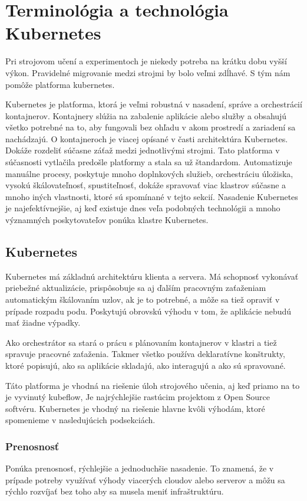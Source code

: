 

\chapter{Terminológia a technológia Kubernetes}
Pri strojovom učení a experimentoch je niekedy potreba na krátku dobu vyšší výkon. Pravidelné migrovanie medzi strojmi by bolo veľmi zdĺhavé. S tým nám pomôže platforma kubernetes.

Kubernetes je platforma, ktorá je veľmi robustná v nasadení, správe a orchestrácií kontajnerov. Kontajnery slúžia na zabalenie aplikácie alebo služby a obsahujú všetko potrebné na to, aby fungovali bez ohľadu v akom prostredí a zariadení sa nachádzajú. O kontajneroch je viacej opísané v časti architektúra Kubernetes. Dokáže rozdeliť súčasne záťaž medzi jednotlivými strojmi. Tato platforma v súčasnosti vytlačila predošle platformy a stala sa už štandardom. Automatizuje manuálne procesy, poskytuje mnoho doplnkových služieb, orchestráciu úložiska, vysokú škálovateľnosť, spustiteľnosť, dokáže spravovať viac klastrov súčasne a mnoho iných vlastnosti, ktoré sú spomínané v tejto sekcií.\cite{vlastnostikub} Nasadenie Kubernetes je najefektívnejšie, aj keď existuje dnes veľa podobných technológii a mnoho významných poskytovateľov ponúka klastre Kubernetes.

\section{Kubernetes}
Kubernetes má základnú architektúru klienta a servera. Má schopnosť vykonávať priebežné aktualizácie, prispôsobuje sa aj ďalším pracovným zaťaženiam automatickým škálovaním uzlov, ak je to potrebné, a môže sa tiež opraviť v prípade rozpadu podu. Poskytujú obrovskú výhodu v tom, že aplikácie nebudú mať žiadne výpadky.

Ako orchestrátor sa stará o prácu s plánovaním kontajnerov v klastri a tiež spravuje pracovné zaťaženia. Takmer všetko používa deklaratívne konštrukty, ktoré popisujú, ako sa aplikácie skladajú, ako interagujú a ako sú spravované.

Táto platforma je vhodná na riešenie úloh strojového učenia, aj keď priamo na to je vyvinutý kubeflow, Je najrýchlejšie rastúcim projektom z Open Source softvéru. Kubernetes je vhodný na riešenie hlavne kvôli výhodám, ktoré spomenieme v nasledujúcich podsekciách.

\subsection*{Prenosnosť}
Ponúka prenosnosť, rýchlejšie a jednoduchšie nasadenie. To znamená, že v prípade potreby využívať výhody viacerých cloudov alebo serverov a môžu sa rýchlo rozvíjať bez toho aby sa musela meniť infraštruktúru.

